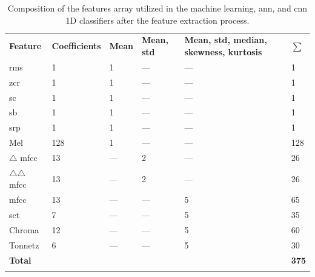 \begin{table}[ht!]
    \caption[Composition of the first features array]{Composition of the features array utilized in the machine learning, \gls{ann}, and \gls{cnn} 1D classifiers after the feature extraction process.}
    \label{table:features_array_composition}
    \centering
    \begin{tabular}{p{3cm}|p{2.5cm}|p{1.2cm}|p{1.9cm}|p{3.5cm}|p{1.3cm}}
        \Xhline{2\arrayrulewidth} 
        \rowcolor{lightgray}
        \textbf{Feature} & \hfil\textbf{Coefficients} & \hfil\textbf{Mean} & \hfil\textbf{Mean, \gls{std}} & \textbf{Mean, \gls{std}, median, skewness, kurtosis} & \hfil\textbf{$\sum{}$}\\
        \Xhline{2\arrayrulewidth}
        \gls{rms} & \hfil 1 & \hfil 1 & \hfil --- & \hfil --- & \hfil 1 \\
        \hline
        \gls{zcr} & \hfil 1 & \hfil 1 & \hfil --- & \hfil --- & \hfil 1 \\
        \hline
        \gls{sc} & \hfil 1 & \hfil 1 & \hfil --- & \hfil --- & \hfil 1 \\
        \hline
        \gls{sb} & \hfil 1 & \hfil 1 & \hfil --- & \hfil --- & \hfil 1 \\
        \hline
        \gls{srp} & \hfil 1 & \hfil 1 & \hfil --- & \hfil --- & \hfil 1 \\
        \hline
        Mel & \hfil 128 & \hfil 1 & \hfil --- & \hfil --- & \hfil 128 \\
        \hline
        $\triangle$ \gls{mfcc} & \hfil 13 & \hfil --- & \hfil 2 & \hfil --- & \hfil 26 \\
        \hline
        $\triangle\triangle$ \gls{mfcc} & \hfil 13 & \hfil --- & \hfil 2 & \hfil --- & \hfil 26 \\
        \hline
        \gls{mfcc} & \hfil 13 & \hfil --- & \hfil --- & \hfil 5 & \hfil 65 \\
        \hline
        \gls{sct} & \hfil 7 & \hfil --- & \hfil --- & \hfil 5 & \hfil 35 \\
        \hline
        Chroma & \hfil 12 & \hfil --- & \hfil --- & \hfil 5 & \hfil 60 \\
        \hline
        Tonnetz & \hfil 6 & \hfil --- & \hfil --- & \hfil 5 & \hfil 30 \\
        \hline
        \hline       
        \rowcolor{gray!20} 
        \textbf{Total} & \multicolumn{4}{c|}{} & \hfil\textbf{375} \\
        \Xhline{2\arrayrulewidth}
    \end{tabular}
\end{table}

